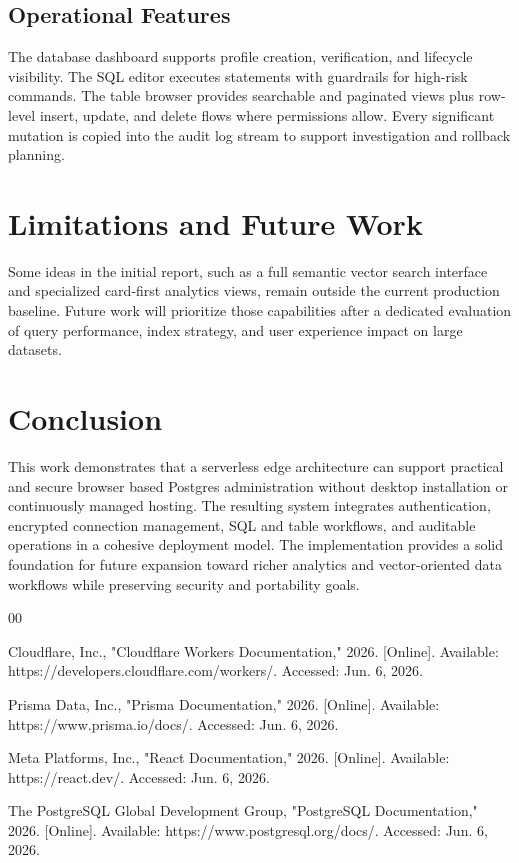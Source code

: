 \documentclass[conference]{IEEEtran}
\begin{document}
\subsection{Operational Features}

The database dashboard supports profile creation, verification, and lifecycle visibility. The SQL editor executes statements with guardrails for high-risk commands. The table browser provides searchable and paginated views plus row-level insert, update, and delete flows where permissions allow. Every significant mutation is copied into the audit log stream to support investigation and rollback planning.

\section{Limitations and Future Work}

Some ideas in the initial report, such as a full semantic vector search interface and specialized card-first analytics views, remain outside the current production baseline. Future work will prioritize those capabilities after a dedicated evaluation of query performance, index strategy, and user experience impact on large datasets.

\section{Conclusion}

This work demonstrates that a serverless edge architecture can support practical and secure browser based Postgres administration without desktop installation or continuously managed hosting. The resulting system integrates authentication, encrypted connection management, SQL and table workflows, and auditable operations in a cohesive deployment model. The implementation provides a solid foundation for future expansion toward richer analytics and vector-oriented data workflows while preserving security and portability goals.


\begin{thebibliography}{00}

Cloudflare, Inc., "Cloudflare Workers Documentation," 2026. [Online]. Available: https://developers.cloudflare.com/workers/. Accessed: Jun. 6, 2026.

Prisma Data, Inc., "Prisma Documentation," 2026. [Online]. Available: https://www.prisma.io/docs/. Accessed: Jun. 6, 2026.

Meta Platforms, Inc., "React Documentation," 2026. [Online]. Available: https://react.dev/. Accessed: Jun. 6, 2026.

The PostgreSQL Global Development Group, "PostgreSQL Documentation," 2026. [Online]. Available: https://www.postgresql.org/docs/. Accessed: Jun. 6, 2026.

\end{thebibliography}


\end{document}
